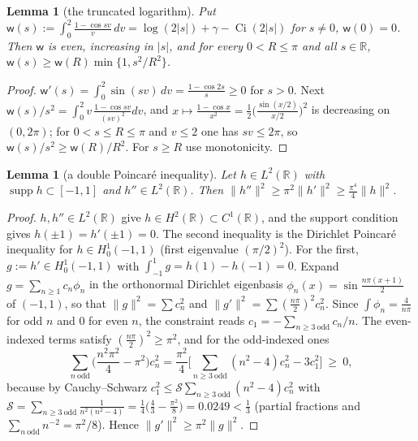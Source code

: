 \documentclass[11pt]{amsart}
\newtheorem{lemma}[theorem]{Lemma}
\theoremstyle{definition}
\theoremstyle{remark}
\newcommand{\R}{\mathbb R}
\newcommand{\supp}{\operatorname{supp}}
\begin{document}
\begin{lemma}[the truncated logarithm]\label{lem:coer-w}
Put $\mathsf w(s):=\int_0^2\frac{1-\cos sv}v\,dv=\log(2|s|)+\gamma-\operatorname{Ci}(2|s|)$ for $s\ne0$, $\mathsf w(0)=0$. Then $\mathsf w$ is
even, increasing in $|s|$, and for every $0<R\le\pi$ and all $s\in\R$, $\mathsf w(s)\ge\mathsf w(R)\min\{1,s^2/R^2\}$.
\end{lemma}
\begin{proof}
$\mathsf w'(s)=\int_0^2\sin(sv)\,dv=\frac{1-\cos2s}s\ge0$ for $s>0$. Next $\mathsf w(s)/s^2=\int_0^2v\,\frac{1-\cos sv}{(sv)^2}dv$, and
$x\mapsto\frac{1-\cos x}{x^2}=\frac12\big(\frac{\sin(x/2)}{x/2}\big)^2$ is decreasing on $(0,2\pi)$; for $0<s\le R\le\pi$ and $v\le2$
one has $sv\le2\pi$, so $\mathsf w(s)/s^2\ge\mathsf w(R)/R^2$. For $s\ge R$ use monotonicity.
\end{proof}

\begin{lemma}[a double Poincar\'e inequality]\label{lem:coer-poinc}
Let $h\in L^2(\R)$ with $\supp h\subset[-1,1]$ and $h''\in L^2(\R)$. Then $\|h''\|^2\ge\pi^2\|h'\|^2\ge\frac{\pi^4}4\|h\|^2$.
\end{lemma}
\begin{proof}
$h,h''\in L^2(\R)$ give $h\in H^2(\R)\subset C^1(\R)$, and the support condition gives $h(\pm1)=h'(\pm1)=0$. The second
inequality is the Dirichlet Poincar\'e inequality for $h\in H^1_0(-1,1)$ (first eigenvalue $(\pi/2)^2$). For the first,
$g:=h'\in H^1_0(-1,1)$ with $\int_{-1}^1g=h(1)-h(-1)=0$. Expand $g=\sum_{n\ge1}c_n\phi_n$ in the orthonormal Dirichlet
eigenbasis $\phi_n(x)=\sin\frac{n\pi(x+1)}2$ of $(-1,1)$, so that $\|g\|^2=\sum c_n^2$ and $\|g'\|^2=\sum(\frac{n\pi}2)^2c_n^2$. Since
$\int\phi_n=\frac4{n\pi}$ for odd $n$ and $0$ for even $n$, the constraint reads $c_1=-\sum_{n\ge3\ \mathrm{odd}}c_n/n$. The
even-indexed terms satisfy $(\frac{n\pi}2)^2\ge\pi^2$, and for the odd-indexed ones
\[
\sum_{n\ \mathrm{odd}}\Big(\frac{n^2\pi^2}4-\pi^2\Big)c_n^2=\frac{\pi^2}4\Big[\sum_{n\ge3\ \mathrm{odd}}(n^2-4)c_n^2-3c_1^2\Big]\ \ge\ 0,
\]
because by Cauchy--Schwarz $c_1^2\le\mathcal S\sum_{n\ge3\ \mathrm{odd}}(n^2-4)c_n^2$ with
$\mathcal S=\sum_{n\ge3\ \mathrm{odd}}\frac1{n^2(n^2-4)}=\frac14\big(\frac43-\frac{\pi^2}8\big)=0.0249<\frac13$ (partial fractions and
$\sum_{n\ \mathrm{odd}}n^{-2}=\pi^2/8$). Hence $\|g'\|^2\ge\pi^2\|g\|^2$.
\end{proof}
\end{document}

